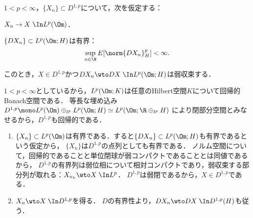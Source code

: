 \documentclass[uplatex,dvipdfmx]{jsreport}
\begin{document}
\begin{lemma}
    $1<p<\infty$，$\{X_n\}\subset D^{1,p}$について，次を仮定する：
    \begin{enumerate}[{[A}1{]}]
        \item $X_n\to X\;\In L^p(\Om)$．
        \item $\{DX_n\}\subset L^p(\Om;H)$は有界：
        \[\sup_{n\in\N}E[\norm{DX_n}^p_H]<\infty.\]
    \end{enumerate}
    このとき，$X\in D^{1,p}$かつ$DX_n\wto DX\;\In L^{p}(\Om;H)$は弱収束する．
\end{lemma}
\begin{Proof}
    $1<p<\infty$としているから，$L^p(\Om;K)$は任意のHilbert空間$K$について回帰的Banach空間である．
    等長な埋め込み$D^{1,p}\mono L^p(\Om)\oplus_{l^p} L^p(\Om;H)\simeq L^p(\Om;\R\oplus_{l^p} H)$
    により閉部分空間とみなせるから，$D^{1,p}$も回帰的である．
    \begin{enumerate}
        \item $\{X_n\}\subset L^p(\Om)$は有界である．すると$\{DX_n\}\subset L^p(\Om;H)$も有界であるという仮定から，
        $\{X_n\}$は$D^{1,p}$の点列としても有界である．
        ノルム空間について，回帰的であることと単位閉球が弱コンパクトであることとは同値であるから，
        $D^{1,p}$の有界列は弱位相について相対コンパクトであり，弱収束する部分列が取れる：$X_{n_k}\wto X\;\In L^p$．
        $D^{1,p}$は弱閉であるから，$X\in D^{1,p}$である．
        \item $X_n\wto X\;\In D^{1,p}$を得る．
        $D$の有界性より，$DX_n\wto DX\;\In D^{1,p}(H)$も従う．
    \end{enumerate}
\end{Proof}
\end{document}
